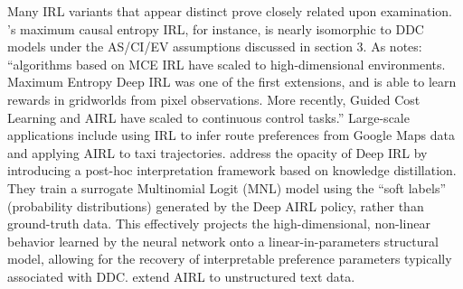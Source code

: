 Many IRL variants that appear distinct prove closely related upon examination. \citet{ziebart:2010}'s maximum causal entropy IRL, for instance, is nearly isomorphic to DDC models under the AS/CI/EV assumptions discussed in section 3. As \citet{gleave:2022} notes:
``algorithms based on MCE IRL have scaled to high-dimensional environments. Maximum Entropy Deep IRL \citet{maxentdeepirl:2016} was one of the first extensions, and is able to learn rewards in gridworlds from pixel observations. More recently, Guided Cost Learning 
\citet{guidedcostlearning:2016} and AIRL have scaled to continuous control tasks.''
Large-scale applications include \citet{Barnes:2024} using IRL to infer route preferences from Google Maps data and \citet{zhao:2023} applying AIRL to taxi trajectories. \citet{liang:2025} address the opacity of Deep IRL by introducing a post-hoc interpretation framework based on knowledge distillation. They train a surrogate Multinomial Logit (MNL) model using the ``soft labels'' (probability distributions) generated by the Deep AIRL policy, rather than ground-truth data. This effectively projects the high-dimensional, non-linear behavior learned by the neural network onto a linear-in-parameters structural model, allowing for the recovery of interpretable preference parameters typically associated with DDC. \citet{lee:2026} extend AIRL to unstructured text data.
 
